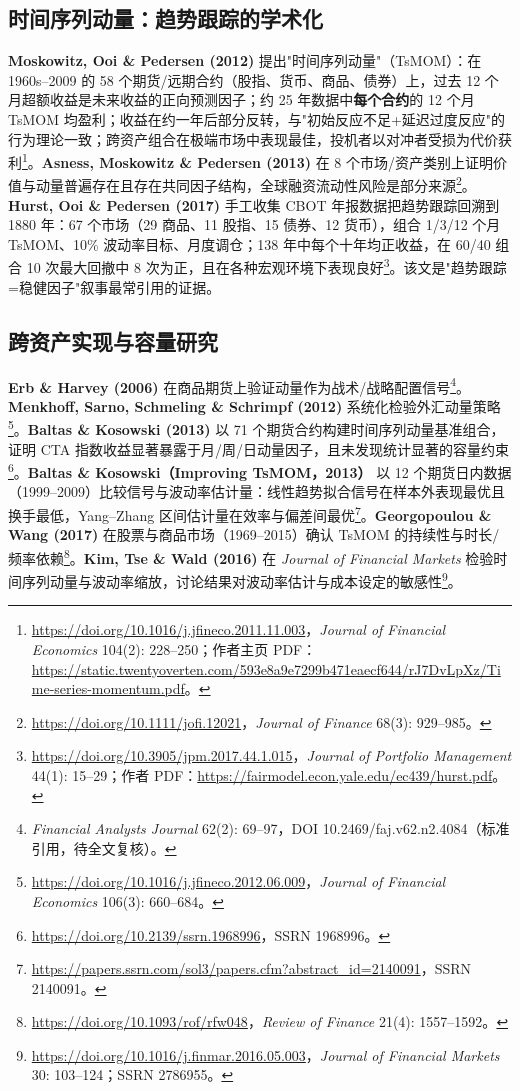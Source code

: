 \documentclass[11pt,a4paper]{article}
\begin{document}
\subsection{时间序列动量：趋势跟踪的学术化}
\textbf{Moskowitz, Ooi \& Pedersen (2012)} 提出"时间序列动量"（TsMOM）：在 1960s--2009 的 58 个期货/远期合约（股指、货币、商品、债券）上，过去 12 个月超额收益是未来收益的正向预测因子；约 25 年数据中\textbf{每个合约}的 12 个月 TsMOM 均盈利；收益在约一年后部分反转，与"初始反应不足+延迟过度反应"的行为理论一致；跨资产组合在极端市场中表现最佳，投机者以对冲者受损为代价获利\footnote{\url{https://doi.org/10.1016/j.jfineco.2011.11.003}，\emph{Journal of Financial Economics} 104(2): 228--250；作者主页 PDF：\url{https://static.twentyoverten.com/593e8a9e7299b471eaecf644/rJ7DvLpXz/Time-series-momentum.pdf}。}。\textbf{Asness, Moskowitz \& Pedersen (2013)} 在 8 个市场/资产类别上证明价值与动量普遍存在且存在共同因子结构，全球融资流动性风险是部分来源\footnote{\url{https://doi.org/10.1111/jofi.12021}，\emph{Journal of Finance} 68(3): 929--985。}。\textbf{Hurst, Ooi \& Pedersen (2017)} 手工收集 CBOT 年报数据把趋势跟踪回溯到 1880 年：67 个市场（29 商品、11 股指、15 债券、12 货币），组合 1/3/12 个月 TsMOM、10\% 波动率目标、月度调仓；138 年中每个十年均正收益，在 60/40 组合 10 次最大回撤中 8 次为正，且在各种宏观环境下表现良好\footnote{\url{https://doi.org/10.3905/jpm.2017.44.1.015}，\emph{Journal of Portfolio Management} 44(1): 15--29；作者 PDF：\url{https://fairmodel.econ.yale.edu/ec439/hurst.pdf}。}。该文是"趋势跟踪=稳健因子"叙事最常引用的证据。

\subsection{跨资产实现与容量研究}
\textbf{Erb \& Harvey (2006)} 在商品期货上验证动量作为战术/战略配置信号\footnote{\emph{Financial Analysts Journal} 62(2): 69--97，DOI 10.2469/faj.v62.n2.4084（标准引用，待全文复核）。}。\textbf{Menkhoff, Sarno, Schmeling \& Schrimpf (2012)} 系统化检验外汇动量策略\footnote{\url{https://doi.org/10.1016/j.jfineco.2012.06.009}，\emph{Journal of Financial Economics} 106(3): 660--684。}。\textbf{Baltas \& Kosowski (2013)} 以 71 个期货合约构建时间序列动量基准组合，证明 CTA 指数收益显著暴露于月/周/日动量因子，且未发现统计显著的容量约束\footnote{\url{https://doi.org/10.2139/ssrn.1968996}，SSRN 1968996。}。\textbf{Baltas \& Kosowski（Improving TsMOM，2013）} 以 12 个期货日内数据（1999--2009）比较信号与波动率估计量：线性趋势拟合信号在样本外表现最优且换手最低，Yang--Zhang 区间估计量在效率与偏差间最优\footnote{\url{https://papers.ssrn.com/sol3/papers.cfm?abstract_id=2140091}，SSRN 2140091。}。\textbf{Georgopoulou \& Wang (2017)} 在股票与商品市场（1969--2015）确认 TsMOM 的持续性与时长/频率依赖\footnote{\url{https://doi.org/10.1093/rof/rfw048}，\emph{Review of Finance} 21(4): 1557--1592。}。\textbf{Kim, Tse \& Wald (2016)} 在 \emph{Journal of Financial Markets} 检验时间序列动量与波动率缩放，讨论结果对波动率估计与成本设定的敏感性\footnote{\url{https://doi.org/10.1016/j.finmar.2016.05.003}，\emph{Journal of Financial Markets} 30: 103--124；SSRN 2786955。}。
\end{document}
